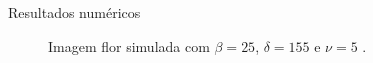 \documentclass[10pt]{beamer}
\begin{document}
\begin{frame}{Resultados numéricos}
\begin{figure}[hbt]
	\caption{Imagem flor simulada com $\beta = 25$, $\delta = 155$ e $\nu = 5$ .}
\end{figure}
\end{frame}
\end{document}

